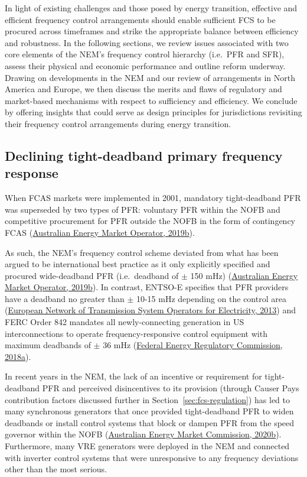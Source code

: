 \documentclass[12pt,a4paper,]{report}
\begin{document}
In light of existing challenges and those posed by energy transition,
effective and efficient frequency control arrangements should enable
sufficient FCS to be procured across timeframes and strike the
appropriate balance between efficiency and robustness. In the following
sections, we review issues associated with two core elements of the
NEM's frequency control hierarchy (i.e.~PFR and SFR), assess their
physical and economic performance and outline reform underway. Drawing
on developments in the NEM and our review of arrangements in North
America and Europe, we then discuss the merits and flaws of regulatory
and market-based mechanisms with respect to sufficiency and efficiency.
We conclude by offering insights that could serve as design principles
for jurisdictions revisiting their frequency control arrangements during
energy transition.

\hypertarget{sec:fcs-pfr}{%
\subsection{Declining tight-deadband primary frequency
response}\label{sec:fcs-pfr}}

When FCAS markets were implemented in 2001, mandatory tight-deadband PFR
was superseded by two types of PFR: voluntary PFR within the NOFB and
competitive procurement for PFR outside the NOFB in the form of
contingency FCAS
(\protect\hyperlink{ref-australianenergymarketoperatorElectricityRuleChange2019}{Australian
Energy Market Operator, 2019b}).

As such, the NEM's frequency control scheme deviated from what has been
argued to be international best practice as it only explicitly specified
and procured wide-deadband PFR (i.e.~deadband of \(\pm\) 150 mHz)
(\protect\hyperlink{ref-australianenergymarketoperatorElectricityRuleChange2019}{Australian
Energy Market Operator, 2019b}). In contrast, ENTSO-E specifies that PFR
providers have a deadband no greater than \(\pm\) 10-15 mHz depending on
the control area
(\protect\hyperlink{ref-europeannetworkoftransmissionsystemoperatorsforelectricityentso-eNetworkCodeLoadFrequency2013}{European
Network of Transmission System Operators for Electricity, 2013}) and
FERC Order 842 mandates all newly-connecting generation in US
interconnections to operate frequency-responsive control equipment with
maximum deadbands of \(\pm\) 36 mHz
(\protect\hyperlink{ref-federalenergyregulatorycommissionfercOrderNo8422018}{Federal
Energy Regulatory Commission, 2018a}).

In recent years in the NEM, the lack of an incentive or requirement for
tight-deadband PFR and perceived disincentives to its provision (through
Causer Pays contribution factors discussed further in
Section~\ref{sec:fcs-regulation}) has led to many synchronous generators
that once provided tight-deadband PFR to widen deadbands or install
control systems that block or dampen PFR from the speed governor within
the NOFB
(\protect\hyperlink{ref-australianenergymarketcommissionMandatoryPrimaryFrequency2020}{Australian
Energy Market Commission, 2020b}). Furthermore, many VRE generators were
deployed in the NEM and connected with inverter control systems that
were unresponsive to any frequency deviations other than the most
serious.
\end{document}
